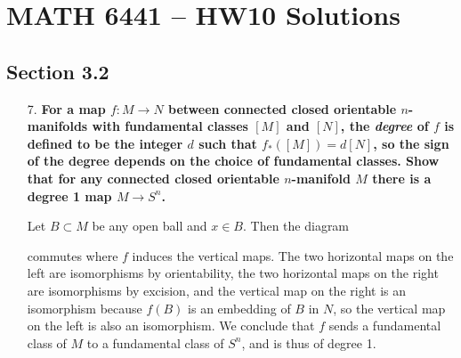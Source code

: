 \documentclass[12pt]{article}
\begin{document}
\section*{MATH 6441 -- HW10 Solutions}
\subsection*{Section 3.2}
\begin{enumerate}
    \item[7.]
        \boldmath\textbf{For a map $f : M \to N$ between connected closed orientable $n$-manifolds with fundamental classes $[M]$ and $[N]$, the \emph{degree} of $f$ is defined to be the integer $d$ such that $f_*([M]) = d[N]$, so the sign of the degree depends on the choice of fundamental classes. Show that for any connected closed orientable $n$-manifold $M$ there is a degree 1 map $M \to S^n$.
        }\unboldmath \par
        Let $B \subset M$ be any open ball and $x \in B$. Then the diagram
        \begin{center}
        \end{center}
        commutes where $f$ induces the vertical maps. The two horizontal maps on the left are isomorphisms by orientability, the two horizontal maps on the right are isomorphisms by excision, and the vertical map on the right is an isomorphism because $f(B)$ is an embedding of $B$ in $N$, so the vertical map on the left is also an isomorphism. We conclude that $f$ sends a fundamental class of $M$ to a fundamental class of $S^n$, and is thus of degree 1.


\end{enumerate}
\end{document}
